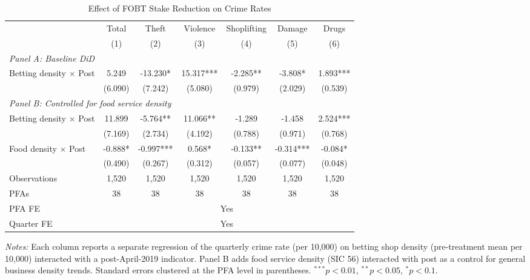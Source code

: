 \begin{table}[htbp]
\centering
\caption{Effect of FOBT Stake Reduction on Crime Rates}
\label{tab:main}
\begin{threeparttable}
\begin{adjustbox}{max width=\textwidth}
\small
\begin{tabular}{lcccccc}
\toprule
 & Total & Theft & Violence & Shoplifting & Damage & Drugs \\
 & (1) & (2) & (3) & (4) & (5) & (6) \\
\midrule
\multicolumn{7}{l}{\textit{Panel A: Baseline DiD}} \\
 Betting density $\times$ Post & 5.249 & -13.230* & 15.317*** & -2.285** & -3.808* & 1.893*** \\
 & (6.090) & (7.242) & (5.080) & (0.979) & (2.029) & (0.539) \\
\midrule
\multicolumn{7}{l}{\textit{Panel B: Controlled for food service density}} \\
 Betting density $\times$ Post & 11.899 & -5.764** & 11.066** & -1.289 & -1.458 & 2.524*** \\
 & (7.169) & (2.734) & (4.192) & (0.788) & (0.971) & (0.768) \\
 Food density $\times$ Post & -0.888* & -0.997*** & 0.568* & -0.133** & -0.314*** & -0.084* \\
 & (0.490) & (0.267) & (0.312) & (0.057) & (0.077) & (0.048) \\
\midrule
Observations & 1,520 & 1,520 & 1,520 & 1,520 & 1,520 & 1,520 \\
PFAs & 38 & 38 & 38 & 38 & 38 & 38 \\
PFA FE & \multicolumn{6}{c}{Yes} \\
Quarter FE & \multicolumn{6}{c}{Yes} \\
\bottomrule
\end{tabular}
\end{adjustbox}
\begin{tablenotes}[flushleft]\footnotesize
\item \textit{Notes:} Each column reports a separate regression of the quarterly crime rate (per 10,000) on betting shop density (pre-treatment mean per 10,000) interacted with a post-April-2019 indicator. Panel B adds food service density (SIC 56) interacted with post as a control for general business density trends. Standard errors clustered at the PFA level in parentheses. $^{***}p<0.01$, $^{**}p<0.05$, $^{*}p<0.1$.
\end{tablenotes}
\end{threeparttable}
\end{table}
